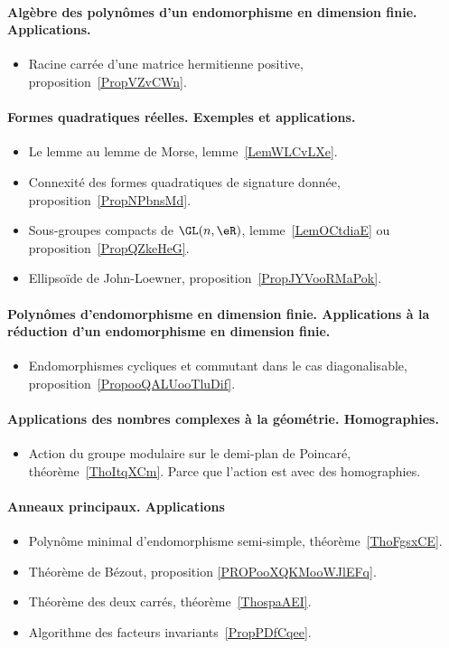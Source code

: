 \paragraph{Algèbre des polynômes d'un endomorphisme en dimension finie. Applications.}
\begin{itemize}
	\item Racine carrée d'une matrice hermitienne positive, proposition~\ref{PropVZvCWn}.
\end{itemize}
\paragraph{Formes quadratiques réelles. Exemples et applications.}
\begin{itemize}
	\item Le lemme au lemme de Morse, lemme~\ref{LemWLCvLXe}.
	\item Connexité des formes quadratiques de signature donnée, proposition~\ref{PropNPbnsMd}.
	\item Sous-groupes compacts de \( \GL(n,\eR)\), lemme~\ref{LemOCtdiaE} ou proposition~\ref{PropQZkeHeG}.
	\item Ellipsoïde de John-Loewner, proposition~\ref{PropJYVooRMaPok}.
\end{itemize}
\paragraph{Polynômes d'endomorphisme en dimension finie. Applications à la réduction d'un endomorphisme en dimension finie.}
\begin{itemize}
	\item Endomorphismes cycliques et commutant dans le cas diagonalisable, proposition~\ref{PropooQALUooTluDif}.
\end{itemize}
\paragraph{Applications des nombres complexes à la géométrie. Homographies.}
\begin{itemize}
	\item Action du groupe modulaire sur le demi-plan de Poincaré, théorème~\ref{ThoItqXCm}. Parce que l'action est avec des homographies.
\end{itemize}

\paragraph{Anneaux principaux. Applications}
\begin{itemize}
	\item Polynôme minimal d'endomorphisme semi-simple, théorème~\ref{ThoFgsxCE}.
	\item Théorème de Bézout, proposition \ref{PROPooXQKMooWJlEFq}.
	\item Théorème des deux carrés, théorème~\ref{ThospaAEI}.
	\item Algorithme des facteurs invariants~\ref{PropPDfCqee}.
\end{itemize}
